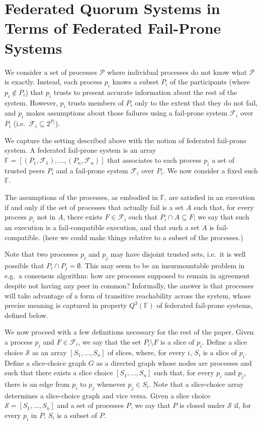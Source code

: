 \documentclass[11pt]{article}
\begin{document}
\section{Federated Quorum Systems in Terms of Federated Fail-Prone Systems}
\label{sec:basic}

We consider a set of processes $\mathcal{P}$ where individual processes do not know what $\mathcal{P}$ is exactly.
Instead, each process $p_i$ knows a subset $P_i$ of the participants (where $p_i\not\in P_i$) that $p_i$ trusts to present accurate information about the rest of the system.
However, $p_i$ trusts members of $P_i$ only to the extent that they do not fail, and $p_i$ makes assumptions about those failures using a fail-prone system $\mathcal{F}_i$ over $P_i$ (i.e.\ $\mathcal{F}_i\subseteq 2^{P_i}$).

We capture the setting described above with the notion of federated fail-prone system. A federated fail-prone system is an array $\mathbb{F}=\left[\left(P_1,\mathcal{F}_1\right),...,\left(P_n,\mathcal{F}_n\right)\right]$ that associates to each process $p_i$ a set of trusted peers $P_i$ and a fail-prone system $\mathcal{F}_i$ over $P_i$. %
We now consider a fixed such $\mathbb{F}$.

The assumptions of the processes, as embodied in $\mathbb{F}$, are satisfied in an execution if and only if the set of processes that actually fail is a set $A$ such that, for every process $p_i$ not in $A$, there exists $F\in\mathcal{F}_i$ such that $P_i\cap A \subseteq F$; we say that such an execution is a fail-compatible execution, and that such a set $A$ is fail-compatible.
{\color{red}(here we could make things relative to a subset of the processes.)}

Note that two processes $p_i$ and $p_j$ may have disjoint trusted sets, i.e.\ it is well possible that $P_i\cap P_j=\emptyset$. This may seem to be an insurmountable problem in e.g.\ a consensus algorithm: how are processes supposed to remain in agreement despite not having any peer in common? Informally, the answer is that processes will take advantage of a form of transitive reachability across the system, whose precise meaning is captured in property $Q^3(\mathbb{F})$ of federated fail-prone systems, defined below.

We now proceed with a few definitions necessary for the rest of the paper.
Given a process $p_i$ and $F\in \mathcal{F}_i$, we say that the set $P_i\setminus F$ is a slice of $p_i$.
Define a slice choice $\mathcal{S}$ as an array $\left[S_1,...,S_n\right]$ of slices, where, for every $i$, $S_i$ is a slice of $p_i$.
Define a slice-choice graph $G$ as a directed graph whose nodes are processes and such that there exists a slice choice $\left[S_1,...,S_n\right]$ such that, for every $p_i$ and $p_j$, there is an edge from $p_i$ to $p_j$ whenever $p_j\in S_i$. Note that a slice-choice array determines a slice-choice graph and vice versa.
Given a slice choice $\mathcal{S}=\left[S_1,...,S_n\right]$ and a set of processes $P$, we say that $P$ is closed under $\mathcal{S}$ if, for every $p_i$ in $P$, $S_i$ is a subset of $P$.
\end{document}
